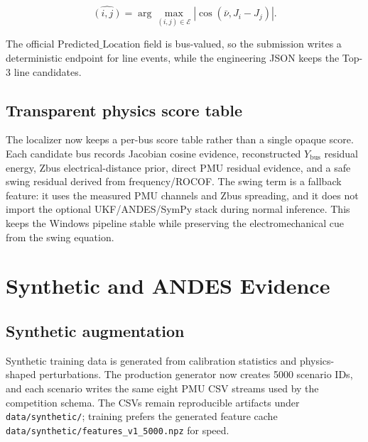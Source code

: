 \documentclass[11pt]{article}
\newcommand{\Ybus}{\ensuremath{Y_{\mathrm{bus}}}}
\newcommand{\PredLoc}{\ensuremath{\mathrm{Predicted\_Location}}}
\begin{document}
\begin{equation}
  \widehat{(i,j)}
  =
  \arg\max_{(i,j)\in\mathcal{E}}
  \left|
  \cos(\bar{\nu}, J_i-J_j)
  \right|.
\end{equation}

The official \PredLoc{} field is bus-valued, so the submission writes a
deterministic endpoint for line events, while the engineering JSON keeps the
Top-3 line candidates.

\subsection{Transparent physics score table}

The localizer now keeps a per-bus score table rather than a single opaque score.
Each candidate bus records Jacobian cosine evidence, reconstructed \Ybus{}
residual energy, Zbus electrical-distance prior, direct PMU residual evidence,
and a safe swing residual derived from frequency/ROCOF. The swing term is a
fallback feature: it uses the measured PMU channels and Zbus spreading, and it
does not import the optional UKF/ANDES/SymPy stack during normal inference. This
keeps the Windows pipeline stable while preserving the electromechanical cue
from the swing equation.

\section{Synthetic and ANDES Evidence}

\subsection{Synthetic augmentation}

Synthetic training data is generated from calibration statistics and
physics-shaped perturbations. The production generator now creates 5000
scenario IDs, and each scenario writes the same eight PMU CSV streams used by
the competition schema. The CSVs remain reproducible artifacts under
\texttt{data/synthetic/}; training prefers the generated feature cache
\texttt{data/synthetic/features\_v1\_5000.npz} for speed.
\end{document}
